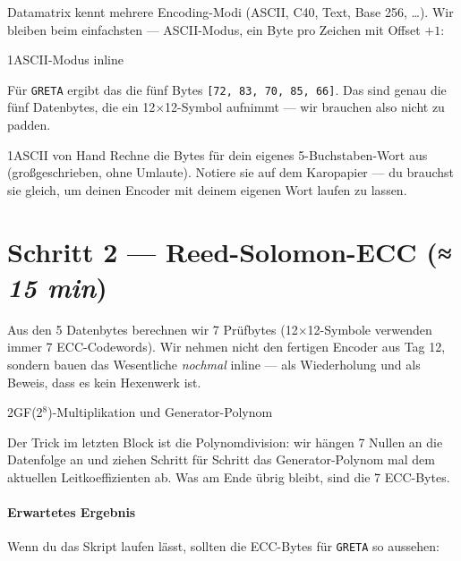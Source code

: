 Datamatrix kennt mehrere Encoding-Modi (ASCII, C40, Text, Base 256,
\dots). Wir bleiben beim einfachsten — ASCII-Modus, ein Byte pro
Zeichen mit Offset $+1$:

\begin{pythoneinheit}{1}{ASCII-Modus inline}

Für \texttt{GRETA} ergibt das die fünf Bytes
\texttt{[72, 83, 70, 85, 66]}. Das sind genau die fünf Datenbytes,
die ein 12$\times$12-Symbol aufnimmt — wir brauchen also nicht zu
padden.
\end{pythoneinheit}

\begin{bleistiftuebung}{1}{ASCII von Hand}
Rechne die Bytes für dein eigenes 5-Buchstaben-Wort aus (groß­geschrieben,
ohne Umlaute). Notiere sie auf dem Karopapier — du brauchst sie
gleich, um deinen Encoder mit deinem eigenen Wort laufen zu lassen.
\end{bleistiftuebung}

\section{Schritt 2 — Reed-Solomon-ECC \normalfont(\textit{≈ 15 min})}

Aus den 5 Datenbytes berechnen wir 7 Prüfbytes (12$\times$12-Symbole
verwenden immer 7 ECC-Codewords). Wir nehmen nicht den fertigen
Encoder aus Tag 12, sondern bauen das Wesentliche \emph{nochmal}
inline — als Wiederholung und als Beweis, dass es kein Hexenwerk ist.

\begin{pythoneinheit}{2}{GF(2$^8$)-Multiplikation und Generator-Polynom}

Der Trick im letzten Block ist die Polynomdivision: wir hängen 7
Nullen an die Datenfolge an und ziehen Schritt für Schritt das
Generator-Polynom mal dem aktuellen Leitkoeffizienten ab. Was am
Ende übrig bleibt, sind die 7 ECC-Bytes.
\end{pythoneinheit}

\paragraph{Erwartetes Ergebnis} Wenn du das Skript laufen lässt,
sollten die ECC-Bytes für \texttt{GRETA} so aussehen:


